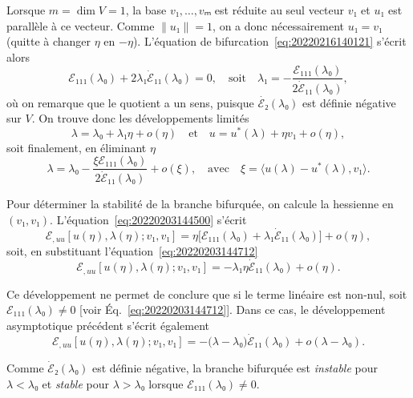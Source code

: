 \documentclass[12pt, final]{amsart}
\begin{document}
Lorsque \(m=\dim V=1\), la base \(v₁, …, vₘ\) est réduite au seul vecteur
\(v₁\) et \(u₁\) est parallèle à ce vecteur. Comme \(\lVert u₁\rVert=1\), on a
donc nécessairement \(u₁=v₁\) (quitte à changer \(η\) en \(-η\)). L'équation de
bifurcation~\eqref{eq:20220216140121} s'écrit alors
\begin{equation}
  \label{eq:20220203144712}
  ℰ₁₁₁(λ₀)+2λ₁\dot{ℰ}₁₁(λ₀)=0,
  \quad\text{soit}\quad
  λ₁=-\frac{ℰ₁₁₁(λ₀)}{2\dot{ℰ}₁₁(λ₀)},
\end{equation}
où on remarque que le quotient a un sens, puisque \(\dot{ℰ₂}(λ₀)\) est définie
négative sur \(V\). On trouve donc les développements limités
\begin{equation}
  λ=λ₀+λ₁η+o(η)
  \quad\text{et}\quad
  u=u^*(λ)+ηv₁+o(η),
\end{equation}
soit finalement, en éliminant \(η\)
\begin{equation}
  λ=λ₀-\frac{ξℰ₁₁₁(λ₀)}{2\dot{ℰ}₁₁(λ₀)}+o(ξ),
  \quad\text{avec}\quad
  ξ=〈u(λ)-u^*(λ), v₁〉.
\end{equation}

Pour déterminer la stabilité de la branche bifurquée, on calcule la hessienne
en \((v₁, v₁)\). L'équation~\eqref{eq:20220203144500} s'écrit
\begin{equation}
  ℰ_{,uu}[u(η), λ(η); v₁, v₁]=η\bigl[ℰ₁₁₁(λ₀)+λ₁\dot{ℰ}₁₁(λ₀)\bigr]+o(η),
\end{equation}
soit, en substituant l'équation~\eqref{eq:20220203144712}
\begin{equation}
  ℰ_{,uu}[u(η), λ(η); v₁, v₁]=-λ₁η\dot{ℰ}₁₁(λ₀)+o(η).
\end{equation}

Ce développement ne permet de conclure que si le terme linéaire est non-nul,
soit \(ℰ₁₁₁(λ₀)≠0\) [voir Éq.~\eqref{eq:20220203144712}]. Dans ce cas, le
développement asymptotique précédent s'écrit également
\begin{equation}
  ℰ_{,uu}[u(η), λ(η); v₁, v₁]=-\bigl(λ-λ₀\bigr)\dot{ℰ}₁₁(λ₀)+o(λ-λ₀).
\end{equation}

Comme \(\dot{ℰ}₂(λ₀)\) est définie négative, la branche bifurquée est
\emph{instable} pour \(λ<λ₀\) et \emph{stable} pour \(λ>λ₀\) lorsque
\(ℰ₁₁₁(λ₀)≠0\).
\end{document}
